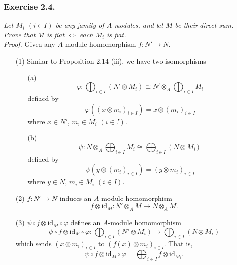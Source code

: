\documentclass{article}
\begin{document}



\subsubsection*{Exercise 2.4.}
\emph{Let $M_i$ $(i \in I)$ be any family of $A$-modules,
and let $M$ be their direct sum.
Prove that $M$ is flat $\Longleftrightarrow$ each $M_i$ is flat.} \\



\emph{Proof.}
Given any $A$-module homomorphism $f: N' \to N$.
\begin{enumerate}
\item[(1)]
  Similar to Proposition 2.14 (iii), we have
  two isomorphisms
  \begin{enumerate}
    \item[(a)]
    \[
      \varphi:
      \bigoplus_{i \in I} (N' \otimes M_i)
      \cong
      N' \otimes_A \bigoplus_{i \in I} M_i
    \]
    defined by
    \[
      \varphi((x \otimes m_i)_{i \in I}) = x \otimes (m_i)_{i \in I}
    \]
    where $x \in N'$, $m_i \in M_i$ $(i \in I)$.

    \item[(b)]
    \[
      \psi:
      N \otimes_A \bigoplus_{i \in I} M_i
      \cong
      \bigoplus_{i \in I} (N \otimes M_i)
    \]
    defined by
    \[
      \psi(y \otimes (m_i)_{i \in I}) = (y \otimes m_i)_{i \in I}
    \]
    where $y \in N$, $m_i \in M_i$ $(i \in I)$.
  \end{enumerate}

\item[(2)]
  $f: N' \to N$ induces an $A$-module homomorphism
  \[
    f \otimes \text{id}_{M}: N' \otimes_A M \to N \otimes_A M.
  \]

\item[(3)]
  $\psi \circ f \otimes \text{id}_{M} \circ \varphi$ defines an $A$-module homomorphism
  \[
    \psi \circ f \otimes \text{id}_{M} \circ \varphi:
    \bigoplus_{i \in I} (N' \otimes M_i) \to \bigoplus_{i \in I} (N \otimes M_i)
  \]
  which sends $(x \otimes m_i)_{i \in I}$ to $(f(x) \otimes m_i)_{i \in I}$.
  That is,
  \[
    \psi \circ f \otimes \text{id}_{M} \circ \varphi
    = \bigoplus_{i \in I} f \otimes \text{id}_{M_i}.
  \]


\end{enumerate}
\end{document}
